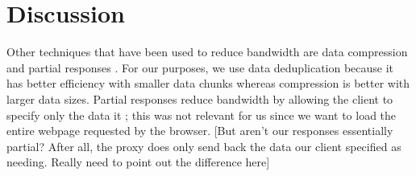 \section{Discussion}
Other techniques that have been used to reduce bandwidth are data compression \cite{?} and partial responses \cite{?}. For our purposes, we use data deduplication because it has better efficiency with smaller data chunks whereas compression is better with larger data sizes. Partial responses reduce bandwidth by allowing the client to specify only the data it ; this was not relevant for us since we want to load the entire webpage requested by the browser. [But aren't our responses essentially partial? After all, the proxy does only send back the data our client specified as needing. Really need to point out the difference here]
